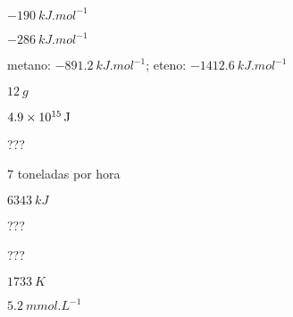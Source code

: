 \documentclass[braun, twocolumn]{braun}
\begin{document}
\begin{answers}

\item {}
\item {}
\item 

\begin{answers}

\item $\qty{-190}{kJ.mol^{-1}}$

\item $\qty{-286}{kJ.mol^{-1}}$

\end{answers}

\item 

\begin{answers}

\item metano: $\qty{-891,2}{kJ.mol^{-1}}$; eteno: $\qty{-1412,6}{kJ.mol^{-1}}$

\item $\qty{12}{g}$

\end{answers}

\item $\qty{4.9E15}{J}$

\item 

\begin{answers}

\item ???

\item $\num{7}$ toneladas por hora

\end{answers}

\item {}
\item {}
\item $\qty{6343}{kJ}$

\item 

\begin{answers}

\item ???

\item ???

\end{answers}

\item {}
\item 

\begin{answers}

\item $\qty{1733}{K}$

\item $\qty{5,2}{mmol.L^{-1}}$

\end{answers}

\item {}
\item {}
\end{answers}
\end{document}
